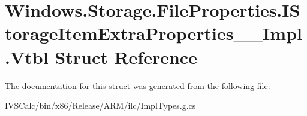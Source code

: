 \hypertarget{struct_windows_1_1_storage_1_1_file_properties_1_1_i_storage_item_extra_properties_____impl_1_1_vtbl}{}\section{Windows.\+Storage.\+File\+Properties.\+I\+Storage\+Item\+Extra\+Properties\+\_\+\+\_\+\+Impl.\+Vtbl Struct Reference}
\label{struct_windows_1_1_storage_1_1_file_properties_1_1_i_storage_item_extra_properties_____impl_1_1_vtbl}


The documentation for this struct was generated from the following file\+:\begin{DoxyCompactItemize}
\item 
I\+V\+S\+Calc/bin/x86/\+Release/\+A\+R\+M/ilc/Impl\+Types.\+g.\+cs\end{DoxyCompactItemize}
